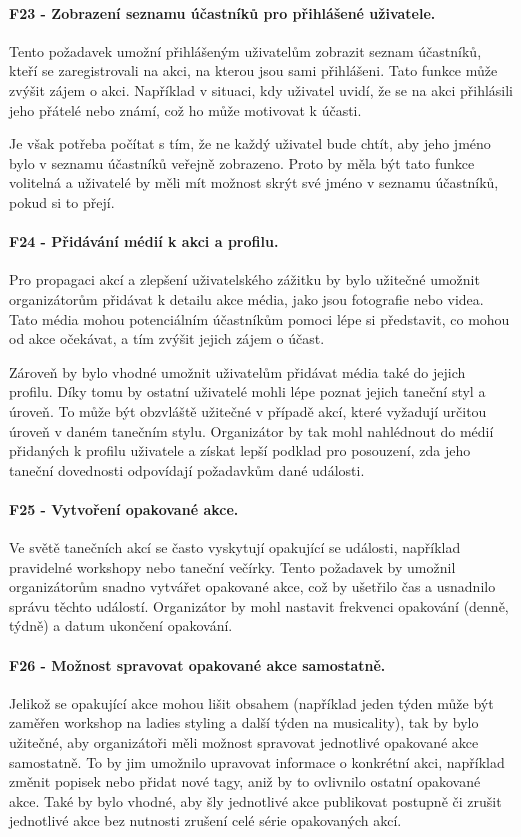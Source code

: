 \paragraph{F23 - Zobrazení seznamu účastníků pro přihlášené uživatele.}\label{req:F23}
Tento požadavek umožní přihlášeným uživatelům zobrazit seznam účastníků, kteří se zaregistrovali na akci, na kterou jsou sami přihlášeni. Tato funkce může zvýšit zájem o akci. Například v situaci, kdy uživatel uvidí, že se na akci přihlásili jeho přátelé nebo známí, což ho může motivovat k účasti.

Je však potřeba počítat s tím, že ne každý uživatel bude chtít, aby jeho jméno bylo v seznamu účastníků veřejně zobrazeno. Proto by měla být tato funkce volitelná a uživatelé by měli mít možnost skrýt své jméno v seznamu účastníků, pokud si to přejí.

\paragraph{F24 - Přidávání médií k akci a profilu.}\label{req:F24}
Pro propagaci akcí a zlepšení uživatelského zážitku by bylo užitečné umožnit organizátorům přidávat k detailu akce média, jako jsou fotografie nebo videa. Tato média mohou potenciálním účastníkům pomoci lépe si představit, co mohou od akce očekávat, a tím zvýšit jejich zájem o účast.

Zároveň by bylo vhodné umožnit uživatelům přidávat média také do jejich profilu. Díky tomu by ostatní uživatelé mohli lépe poznat jejich taneční styl a úroveň. To může být obzvláště užitečné v případě akcí, které vyžadují určitou úroveň v daném tanečním stylu. Organizátor by tak mohl nahlédnout do médií přidaných k profilu uživatele a získat lepší podklad pro posouzení, zda jeho taneční dovednosti odpovídají požadavkům dané události.

\paragraph{F25 - Vytvoření opakované akce.}\label{req:F25}
Ve světě tanečních akcí se často vyskytují opakující se události, například pravidelné workshopy nebo taneční večírky. Tento požadavek by umožnil organizátorům snadno vytvářet opakované akce, což by ušetřilo čas a usnadnilo správu těchto událostí. Organizátor by mohl nastavit frekvenci opakování (denně, týdně) a datum ukončení opakování.

\paragraph{F26 - Možnost spravovat opakované akce samostatně.}\label{req:F26}
Jelikož se opakující akce mohou lišit obsahem (například jeden týden může být zaměřen workshop na ladies styling a další týden na musicality), tak by bylo užitečné, aby organizátoři měli možnost spravovat jednotlivé opakované akce samostatně. To by jim umožnilo upravovat informace o konkrétní akci, například změnit popisek nebo přidat nové tagy, aniž by to ovlivnilo ostatní opakované akce. Také by bylo vhodné, aby šly jednotlivé akce publikovat postupně či zrušit jednotlivé akce bez nutnosti zrušení celé série opakovaných akcí.

